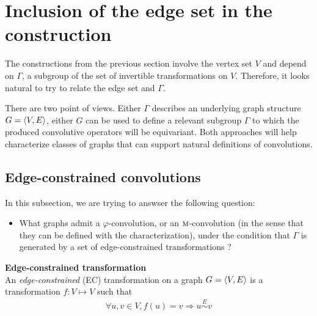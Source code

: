 \section{Inclusion of the edge set in the construction}
\label{sec:edges}


The constructions from the previous section involve the vertex set $V$ and depend on $\Gamma$, a subgroup of the set of invertible transformations on $V$. Therefore, it looks natural to try to relate the edge set and $\Gamma$.

There are two point of views. Either $\Gamma$ describes an underlying graph structure $G = \langle V, E \rangle$, either $G$ can be used to define a relevant subgroup $\Gamma$ to which the produced convolutive operators will be equivariant. Both approaches will help characterize classes of graphs that can support natural definitions of convolutions.




\subsection{Edge-constrained convolutions}
\label{sec:cayley}

In this subsection, we are trying to answser the following question:
\begin{itemize}
	\item What graphs admit a $\varphi$-convolution, or an $\operatorname{\textsc{m}}$-convolution (in the sense that they can be defined with the characterization), under the condition that $\Gamma$ is generated by a set of edge-constrained transformations ?
\end{itemize}

\begin{definition}\textbf{Edge-constrained transformation}\\
An \emph{edge-constrained} (EC) transformation on a graph $G = \langle V, E \rangle$ is a transformation $f: V \mapsto V$ such that
\begin{gather*}
\forall u,v \in V, f(u) = v \Rightarrow u \overset{E}{\sim} v
\end{gather*}
\end{definition}

